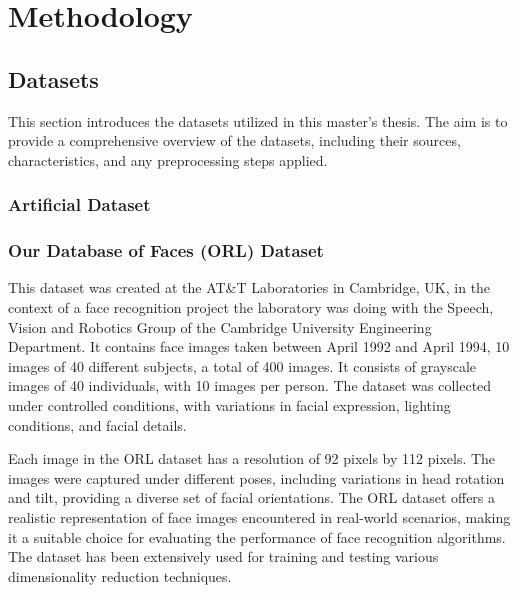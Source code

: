 \chapter{Methodology}






\section{Datasets}
This section introduces the datasets utilized in this master's thesis. The aim is to provide a comprehensive overview of the datasets, including their sources, characteristics, and any preprocessing steps applied.

\subsection{Artificial Dataset}\label{section:artificial-dataset}


\subsection{Our Database of Faces (ORL) Dataset}\label{section:orl-dataset}
This dataset was created at the AT\&T Laboratories in Cambridge, UK, in the context of a face recognition project the laboratory was doing with the Speech, Vision and Robotics Group of the Cambridge University Engineering Department. It contains face images taken between April 1992 and April 1994, 10 images of 40 different subjects, a total of 400 images. It consists of grayscale images of 40 individuals, with 10 images per person. The dataset was collected under controlled conditions, with variations in facial expression, lighting conditions, and facial details.

Each image in the ORL dataset has a resolution of 92 pixels by 112 pixels. The images were captured under different poses, including variations in head rotation and tilt, providing a diverse set of facial orientations. The ORL dataset offers a realistic representation of face images encountered in real-world scenarios, making it a suitable choice for evaluating the performance of face recognition algorithms. The dataset has been extensively used for training and testing various dimensionality reduction techniques.

